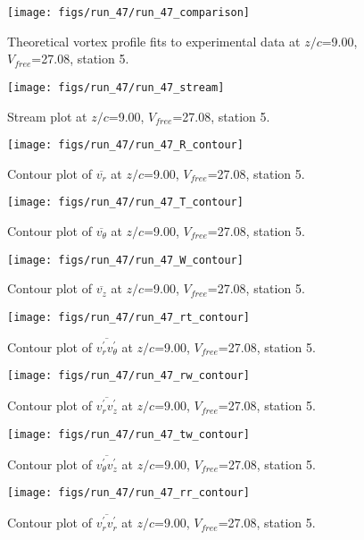 \begin{figure}[H]
\centering
\texttt{[image: figs/run\_47/run\_47\_comparison]}
\caption{Theoretical vortex profile fits to experimental data at $z/c$=9.00, $V_{free}$=27.08, station 5.}
\end{figure}


\begin{figure}[H]
\centering
\texttt{[image: figs/run\_47/run\_47\_stream]}
\caption{Stream plot at $z/c$=9.00, $V_{free}$=27.08, station 5.}
\end{figure}


\begin{figure}[H]
\centering
\texttt{[image: figs/run\_47/run\_47\_R\_contour]}
\caption{Contour plot of $\overline{v_{r}}$ at $z/c$=9.00, $V_{free}$=27.08, station 5.}
\end{figure}


\begin{figure}[H]
\centering
\texttt{[image: figs/run\_47/run\_47\_T\_contour]}
\caption{Contour plot of $\overline{v_{\theta}}$ at $z/c$=9.00, $V_{free}$=27.08, station 5.}
\end{figure}


\begin{figure}[H]
\centering
\texttt{[image: figs/run\_47/run\_47\_W\_contour]}
\caption{Contour plot of $\overline{v_{z}}$ at $z/c$=9.00, $V_{free}$=27.08, station 5.}
\end{figure}


\begin{figure}[H]
\centering
\texttt{[image: figs/run\_47/run\_47\_rt\_contour]}
\caption{Contour plot of $\overline{v_{r}^{\prime} v_{\theta}^{\prime}}$ at $z/c$=9.00, $V_{free}$=27.08, station 5.}
\end{figure}


\begin{figure}[H]
\centering
\texttt{[image: figs/run\_47/run\_47\_rw\_contour]}
\caption{Contour plot of $\overline{v_{r}^{\prime} v_{z}^{\prime}}$ at $z/c$=9.00, $V_{free}$=27.08, station 5.}
\end{figure}


\begin{figure}[H]
\centering
\texttt{[image: figs/run\_47/run\_47\_tw\_contour]}
\caption{Contour plot of $\overline{v_{\theta}^{\prime} v_{z}^{\prime}}$ at $z/c$=9.00, $V_{free}$=27.08, station 5.}
\end{figure}


\begin{figure}[H]
\centering
\texttt{[image: figs/run\_47/run\_47\_rr\_contour]}
\caption{Contour plot of $\overline{v_{r}^{\prime} v_{r}^{\prime}}$ at $z/c$=9.00, $V_{free}$=27.08, station 5.}
\end{figure}


